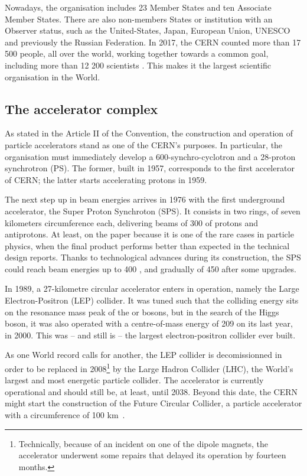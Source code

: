 Nowadays, the organisation includes 23 Member States and ten Associate Member States. There are also non-members States or institution with an Observer status, such as the United-States, Japan, European Union, UNESCO and previously the Russian Federation. In 2017, the CERN counted more than 17 500 people, all over the world, working together towards a common goal, including more than 12 200 scientists \cite{cernOurPeople2023}. This makes it the largest scientific organisation in the World.

\subsection{The accelerator complex}
\label{subsec:AcceleratorComplex}

As stated in the Article II of the Convention, the construction and operation of particle accelerators stand as one of the CERN's purposes. In particular, the organisation must immediately develop a 600-\mev synchro-cyclotron and a 28-\gev proton synchrotron (PS). The former, built in 1957, corresponds to the first accelerator of CERN; the latter starts accelerating protons in 1959.

The next step up in beam energies arrives in 1976 with the first underground accelerator, the Super Proton Synchroton (SPS). It consists in two rings, of seven kilometers circumference each, delivering beams of 300 \gev of protons and antiprotons. At least, on the paper because it is one of the rare cases in particle physics, when the final product performs better than expected in the technical design reports. Thanks to technological advances during its construction, the SPS could reach beam energies up to 400 \gev, and gradually of 450 \gev after some upgrades.

In 1989, a 27-kilometre circular accelerator enters in operation, namely the Large Electron-Positron (LEP) collider. It was tuned such that the colliding energy sits on the resonance mass peak of the \rmZzero or \rmWplusminus bosons, but in the search of the Higgs boson, it was also operated with a centre-of-mass energy of 209 \gev on its last year, in 2000. This was -- and still is -- the largest electron-positron collider ever built.

As one World record calls for another, the LEP collider is decomissionned in order to be replaced in 2008\footnote{Technically, because of an incident on one of the dipole magnets, the accelerator underwent some repairs that delayed its operation by fourteen months.} by the Large Hadron Collider (LHC), the World's largest and most energetic particle collider. The accelerator is currently operational and should still be, at least, until 2038. Beyond this date, the CERN might start the construction of the Future Circular Collider, a particle accelerator with a circumference of 100 km~\cite{FutureCircularCollider2023}\cite{benediktFutureCircularCollider2019}.\\

